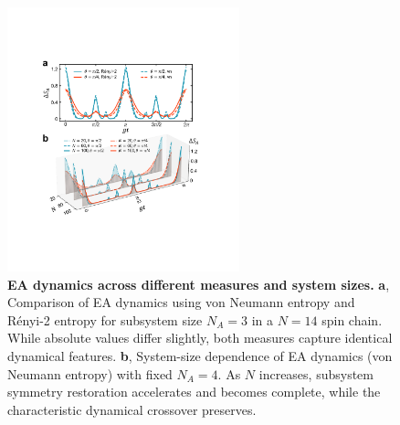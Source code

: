 \documentclass[reprint,superscriptaddress,preprintnumbers,longbibliography,
amsmath,amssymb,aps,floatfix,pra,twocolumn, tightenlines %
]{revtex4-2}
\begin{document}
    \begin{figure}[t]
    \centering
    \includegraphics[width=0.6\textwidth]{suppFig/SuppFig2_vn_renyi_tunable_N.pdf}
    \caption{  \textbf{EA dynamics across different measures and system sizes.}
        \textbf{a}, Comparison of EA dynamics using von Neumann entropy and Rényi-2 entropy for subsystem size $N_A = 3$ in a $N = 14$ spin chain. While absolute values differ slightly, both measures capture identical dynamical features.
        \textbf{b}, System-size dependence of EA dynamics (von Neumann entropy) with fixed $N_A = 4$. As $N$ increases, subsystem symmetry restoration accelerates and becomes complete, while the characteristic dynamical crossover preserves.
        }
    \label{fig:tunable.N}
    \end{figure}
    
\end{document}
